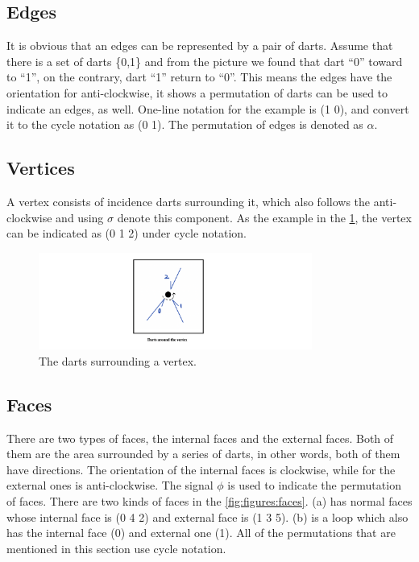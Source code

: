 \subsection{Edges}
It is obvious that an edges can be represented by a pair of darts. Assume that there is a set of darts \{0,1\} and from the picture we found that dart “0” toward to “1”, on the contrary, dart “1” return to “0”. This means the edges have the orientation for anti-clockwise, it shows a permutation of darts can be used to indicate an edges, as well. One-line notation for the example is (1 0), and convert it to the cycle notation as (0 1). The permutation of edges is denoted as \(\alpha\).

\subsection{Vertices}
A vertex consists of incidence darts surrounding it, which also follows the anti-clockwise and using \(\sigma\) denote this component. As the example in the \cref{fig:figures:vertex}, the vertex can be indicated as (0 1 2) under cycle notation.

\begin{figure}[htb]
  \centering
  \includegraphics[width=0.8\textwidth]{../../image/vertex.png}
  \caption{The darts surrounding a vertex.}
  \label{fig:figures:vertex}
\end{figure}

\subsection{Faces}
There are two types of faces, the internal faces and the external faces. Both of them are the area surrounded by a series of darts, in other words, both of them have directions. The orientation of the internal faces is clockwise, while for the external ones is anti-clockwise. The signal \(\phi\) is used to indicate the permutation of faces. There are two kinds of faces in the \cref{fig:figures:faces}. (a) has normal faces whose internal face is (0 4 2) and external face is (1 3 5). (b) is a loop which also has the internal face (0) and external one (1). All of the permutations that are mentioned in this section use cycle notation.

